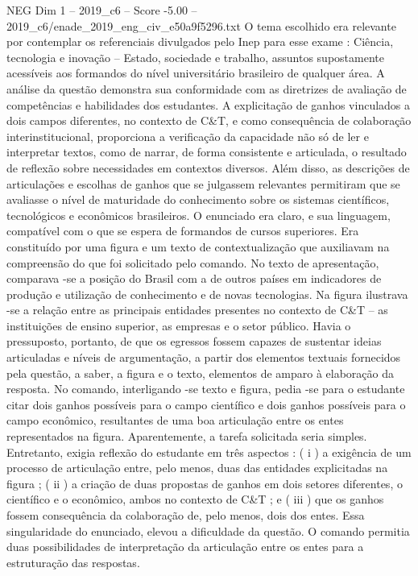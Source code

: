 \begin{textsample}{NEG Dim 1 – 2019\_c6 – Score -5.00 – 2019\_c6/enade\_2019\_eng\_civ\_e50a9f5296.txt}
O tema escolhido era relevante por contemplar os referenciais divulgados pelo Inep para esse exame : Ciência, tecnologia e inovação – Estado, sociedade e trabalho, assuntos supostamente acessíveis aos formandos do nível universitário brasileiro de qualquer área.
A análise da questão demonstra sua conformidade com as diretrizes de avaliação de competências e habilidades dos estudantes.
A explicitação de ganhos vinculados a dois campos diferentes, no contexto de C\&T, e como consequência de colaboração interinstitucional, proporciona a verificação da capacidade não só de ler e interpretar textos, como de narrar, de forma consistente e articulada, o resultado de reflexão sobre necessidades em contextos diversos.
Além disso, as descrições de articulações e escolhas de ganhos que se julgassem relevantes permitiram que se avaliasse o nível de maturidade do conhecimento sobre os sistemas científicos, tecnológicos e econômicos brasileiros.
O enunciado era claro, e sua linguagem, compatível com o que se espera de formandos de cursos superiores.
Era constituído por uma figura e um texto de contextualização que auxiliavam na compreensão do que foi solicitado pelo comando.
No texto de apresentação, comparava -se a posição do Brasil com a de outros países em indicadores de produção e utilização de conhecimento e de novas tecnologias.
Na figura ilustrava -se a relação entre as principais entidades presentes no contexto de C\&T – as instituições de ensino superior, as empresas e o setor público.
Havia o pressuposto, portanto, de que os egressos fossem capazes de sustentar ideias articuladas e níveis de argumentação, a partir dos elementos textuais fornecidos pela questão, a saber, a figura e o texto, elementos de amparo à elaboração da resposta.
No comando, interligando -se texto e figura, pedia -se para o estudante citar dois ganhos possíveis para o campo científico e dois ganhos possíveis para o campo econômico, resultantes de uma boa articulação entre os entes representados na figura.
Aparentemente, a tarefa solicitada seria simples.
Entretanto, exigia reflexão do estudante em três aspectos : ( i ) a exigência de um processo de articulação entre, pelo menos, duas das entidades explicitadas na figura ; ( ii ) a criação de duas propostas de ganhos em dois setores diferentes, o científico e o econômico, ambos no contexto de C\&T ; e ( iii ) que os ganhos fossem consequência da colaboração de, pelo menos, dois dos entes.
Essa singularidade do enunciado, elevou a dificuldade da questão.
O comando permitia duas possibilidades de interpretação da articulação entre os entes para a estruturação das respostas.

\end{textsample}
